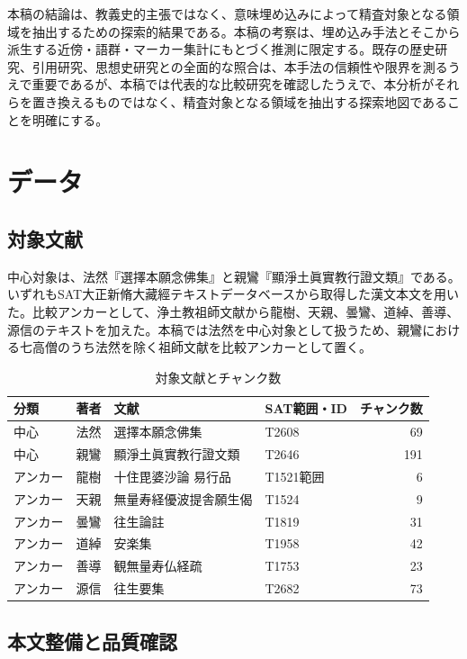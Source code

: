 \documentclass[uplatex,dvipdfmx,11pt,a4paper]{jsarticle}
\begin{document}
本稿の結論は、教義史的主張ではなく、意味埋め込みによって精査対象となる領域を抽出するための探索的結果である。本稿の考察は、埋め込み手法とそこから派生する近傍・語群・マーカー集計にもとづく推測に限定する。既存の歴史研究、引用研究、思想史研究との全面的な照合は、本手法の信頼性や限界を測るうえで重要であるが、本稿では代表的な比較研究を確認したうえで、本分析がそれらを置き換えるものではなく、精査対象となる領域を抽出する探索地図であることを明確にする。

\section{データ}

\subsection{対象文献}

中心対象は、法然『選擇本願念佛集』と親鸞『顯淨土眞實教行證文類』である。いずれもSAT大正新脩大藏經テキストデータベースから取得した漢文本文を用いた。比較アンカーとして、浄土教祖師文献から龍樹、天親、曇鸞、道綽、善導、源信のテキストを加えた。本稿では法然を中心対象として扱うため、親鸞における七高僧のうち法然を除く祖師文献を比較アンカーとして置く。

\begin{table}[H]
\centering
\small
\caption{対象文献とチャンク数}
\label{tab:corpus}
\begin{tabular}{@{}llllr@{}}
\toprule
分類 & 著者 & 文献 & SAT範囲・ID & チャンク数 \\
\midrule
中心 & 法然 & 選擇本願念佛集 & T2608 & 69 \\
中心 & 親鸞 & 顯淨土眞實教行證文類 & T2646 & 191 \\
アンカー & 龍樹 & 十住毘婆沙論 易行品 & T1521範囲 & 6 \\
アンカー & 天親 & 無量寿経優波提舎願生偈 & T1524 & 9 \\
アンカー & 曇鸞 & 往生論註 & T1819 & 31 \\
アンカー & 道綽 & 安楽集 & T1958 & 42 \\
アンカー & 善導 & 観無量寿仏経疏 & T1753 & 23 \\
アンカー & 源信 & 往生要集 & T2682 & 73 \\
\bottomrule
\end{tabular}
\end{table}

\subsection{本文整備と品質確認}
\end{document}
